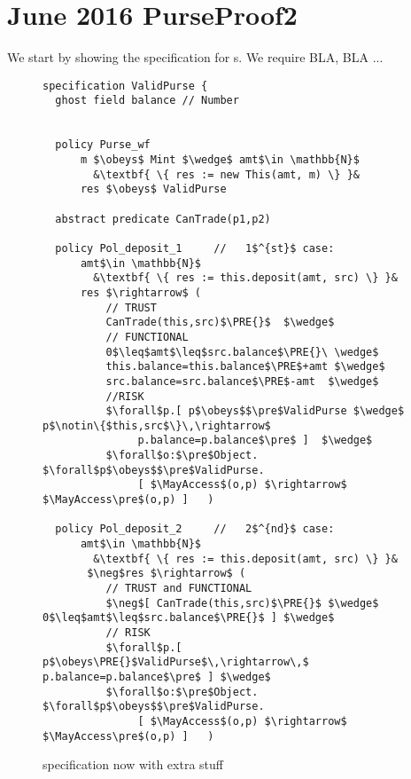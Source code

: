 \section{June 2016 PurseProof2}

We start by showing the specification for s. We require BLA, BLA ...

\begin{figure*}[hbt]
\begin{lstlisting}[escapechar=&]
specification ValidPurse {
  ghost field balance // Number


  policy Purse_wf 
      m $\obeys$ Mint $\wedge$ amt$\in \mathbb{N}$
        &\textbf{ \{ res := new This(amt, m) \} }&
      res $\obeys$ ValidPurse 

  abstract predicate CanTrade(p1,p2)

  policy Pol_deposit_1     //   1$^{st}$ case:
      amt$\in \mathbb{N}$
        &\textbf{ \{ res := this.deposit(amt, src) \} }&
      res $\rightarrow$ (
          // TRUST
          CanTrade(this,src)$\PRE{}$  $\wedge$
          // FUNCTIONAL  
          0$\leq$amt$\leq$src.balance$\PRE{}\ \wedge$
          this.balance=this.balance$\PRE$+amt $\wedge$
          src.balance=src.balance$\PRE$-amt  $\wedge$
          //RISK
          $\forall$p.[ p$\obeys$$\pre$ValidPurse $\wedge$ p$\notin\{$this,src$\}\,\rightarrow$
               p.balance=p.balance$\pre$ ]  $\wedge$
          $\forall$o:$\pre$Object. $\forall$p$\obeys$$\pre$ValidPurse.
               [ $\MayAccess$(o,p) $\rightarrow$ $\MayAccess\pre$(o,p) ]   )

  policy Pol_deposit_2     //   2$^{nd}$ case:
      amt$\in \mathbb{N}$
        &\textbf{ \{ res := this.deposit(amt, src) \} }&
       $\neg$res $\rightarrow$ (
          // TRUST and FUNCTIONAL  
          $\neg$[ CanTrade(this,src)$\PRE{}$ $\wedge$ 0$\leq$amt$\leq$src.balance$\PRE{}$ ] $\wedge$
          // RISK
          $\forall$p.[ p$\obeys\PRE{}$ValidPurse$\,\rightarrow\,$ p.balance=p.balance$\pre$ ] $\wedge$
          $\forall$o:$\pre$Object. $\forall$p$\obeys$$\pre$ValidPurse.
               [ $\MayAccess$(o,p) $\rightarrow$ $\MayAccess\pre$(o,p) ]   )
\end{lstlisting}
\caption{ specification now with extra stuff
  }
\label{fig:ValidPurseX}
\end{figure*}




